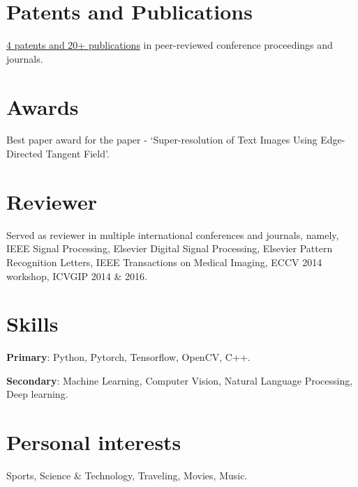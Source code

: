 \documentclass[a4paper,online]{adcv}
\begin{document}
\begin{adcvtabletwo}
  

\end{adcvtabletwo}

\section{Patents and Publications}

\href{https://scholar.google.co.in/citations?user=SaF-0PcAAAAJ&hl=en}{4 patents and 20+ publications} in peer-reviewed conference proceedings and journals.

\section{Awards}

Best paper award for the paper - `Super-resolution of Text Images Using Edge-Directed Tangent Field'.

\section{Reviewer}

Served as reviewer in multiple international conferences and journals, namely, IEEE Signal Processing, Elsevier Digital Signal Processing, Elsevier Pattern Recognition Letters, IEEE Transactions on Medical Imaging, ECCV 2014 workshop, ICVGIP 2014 \& 2016.

\section{Skills}

\textbf{Primary}: Python, Pytorch, Tensorflow, OpenCV, C++.

\textbf{Secondary}: Machine Learning, Computer Vision, Natural Language Processing, Deep learning.


\section{Personal interests}

Sports, Science \& Technology, Traveling, Movies, Music.
\end{document}
